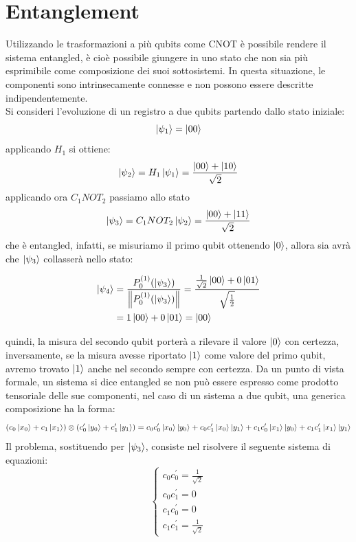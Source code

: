 \documentclass[12pt,a4paper,openright]{report}
\newcommand{\norm}[1]{\left\lVert#1\right\rVert}
\begin{document}
\section{Entanglement}
Utilizzando le trasformazioni a più qubits come CNOT è possibile rendere il sistema entangled, è cioè possibile giungere in uno stato che non sia più esprimibile come composizione dei suoi sottosistemi.
In questa situazione, le componenti sono intrinsecamente connesse e non possono essere descritte indipendentemente.\\
Si consideri l'evoluzione di un registro a due qubits partendo dallo stato iniziale:    
\[
    \ket{\psi_1}= \ket{00}
\] 
applicando $H_1$ si ottiene:
\[
    \ket{\psi_2} = H_1\ket{\psi_1} = \frac{ \ket{00} + \ket{10} }{\sqrt2}
\]
applicando ora $C_1NOT_2$ passiamo allo stato 
\[
    \ket{\psi_3} = C_1NOT_2\ket{\psi_2} = \frac{ \ket{00} + \ket{11} }{\sqrt2}
\]
che è entangled, infatti, se misuriamo il primo qubit ottenendo $\ket0$, allora sia avrà che $\ket{\psi_3}$ collasserà nello stato:
\begin{center}
    \begin{align*}
        \ket{\psi_4} &= \frac{{P^{(1)}_0}(\ket{\psi_3}) }{ \norm{{P^{(1)}_0}(\ket{\psi_3})} } = \frac{  \frac{1}{\sqrt2}\ket{00} + 0\ket{01}  }{\sqrt{\frac{1}{2}}}\\*
        &=1\ket{00} + 0\ket{01} = \ket{00}
    \end{align*}
\end{center}
quindi, la misura del secondo qubit porterà a rilevare il valore $\ket0$ con certezza, inversamente, se la misura avesse riportato $\ket1$ come valore del primo qubit, avremo trovato $\ket1$ anche nel secondo
sempre con certezza. Da un punto di vista formale, un sistema si dice entangled se non può essere espresso come prodotto tensoriale delle sue componenti, nel caso di un sistema a due qubit, una generica composizione
ha la forma:
    \[
        (c_0\ket{x_0} + c_1\ket{x_1}) \otimes (c^{\prime}_0\ket{y_0} + c^{\prime}_1\ket{y_1}) = c_0c^{\prime}_0\ket{x_0}\ket{y_0} + c_0c^{\prime}_1\ket{x_0}\ket{y_1} + c_1c^{\prime}_0\ket{x_1}\ket{y_0} + c_1c^{\prime}_1\ket{x_1}\ket{y_1}
    \]
Il problema, sostituendo per $\ket{\psi_3}$, consiste nel risolvere il seguente sistema di equazioni:
\[\begin{cases} 
    c_0c^{\prime}_0 = \frac{1}{\sqrt2} \\ 
    c_0c^{\prime}_1 = 0\\ 
    c_1c^{\prime}_0 = 0\\
    c_1c^{\prime}_1 = \frac{1}{\sqrt2}
\end{cases}
\]  
\end{document}
